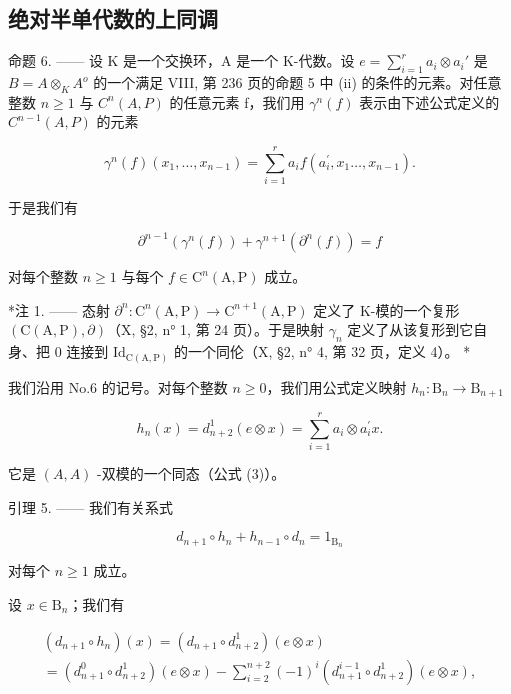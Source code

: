 \subsection{绝对半单代数的上同调}

命题 6. —— 设 K 是一个交换环，A 是一个 K-代数。设 \(e = \sum_{i=1}^{r} a_i \otimes a_i'\) 是 \(B = A \otimes_K A^o\) 的一个满足 VIII, 第 236 页的命题 5 中 (ii) 的条件的元素。对任意整数 \(n \geqslant 1\) 与 \(C^n(A, P)\) 的任意元素 f，我们用 \(\gamma^n(f)\) 表示由下述公式定义的 \(C^{n-1}(A, P)\) 的元素

\[
\gamma^ {n} (f) \left(x _ {1}, \dots , x _ {n - 1}\right) = \sum_ {i = 1} ^ {r} a _ {i} f \left(a _ {i} ^ {\prime}, x _ {1} \dots , x _ {n - 1}\right).\tag{15}
\]

于是我们有

\[
\partial^ {n - 1} (\gamma^ {n} (f)) + \gamma^ {n + 1} (\partial^ {n} (f)) = f\tag{16}
\]

对每个整数 \(n \geqslant 1\) 与每个 \(f \in \mathrm{C}^n(\mathrm{A},\mathrm{P})\) 成立。

*注 1. —— 态射 \(\partial^n: \mathrm{C}^n(\mathrm{A},\mathrm{P}) \to \mathrm{C}^{n+1}(\mathrm{A},\mathrm{P})\) 定义了 K-模的一个复形 \((\mathrm{C}(\mathrm{A},\mathrm{P}),\partial)\)（X, §2, n° 1, 第 24 页）。于是映射 \(\gamma_n\) 定义了从该复形到它自身、把 0 连接到 \(\mathrm{Id}_{\mathrm{C}(\mathrm{A},\mathrm{P})}\) 的一个同伦（X, §2, n° 4, 第 32 页，定义 4）。 *

我们沿用 No.6 的记号。对每个整数 \(n \geqslant 0\)，我们用公式定义映射 \(h_n: \mathrm{B}_n \to \mathrm{B}_{n+1}\)

\[
h _ {n} (x) = d _ {n + 2} ^ {1} (e \otimes x) = \sum_ {i = 1} ^ {r} a _ {i} \otimes a _ {i} ^ {\prime} x.
\]

它是 \((A, A)\) -双模的一个同态（公式 (3)）。

引理 5. —— 我们有关系式

\[
d _ {n + 1} \circ h _ {n} + h _ {n - 1} \circ d _ {n} = 1 _ {\mathrm{B} _ {n}}\tag{17}
\]

对每个 \(n \geqslant 1\) 成立。

设 \(x\in \mathrm{B}_n\)；我们有

\[
\begin{array}{c} (d _ {n + 1} \circ h _ {n}) (x) = (d _ {n + 1} \circ d _ {n + 2} ^ {1}) (e \otimes x) \\ = (d _ {n + 1} ^ {0} \circ d _ {n + 2} ^ {1}) (e \otimes x) - \sum_ {i = 2} ^ {n + 2} (- 1) ^ {i} (d _ {n + 1} ^ {i - 1} \circ d _ {n + 2} ^ {1}) (e \otimes x), \end{array}
\]

